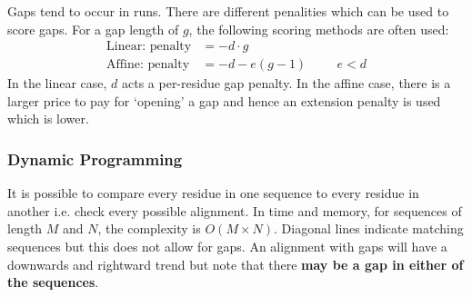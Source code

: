 \documentclass[a4paper]{article}
\newcommand{\ix}[1]{%
  \leavevmode %
  \marginpar{\small\emph{#1}}%
}
\begin{document}
Gaps tend to occur in runs. There are different penalities which can be used to score gaps. For a gap length of $g$, the following scoring methods are often used:
\begin{align*}
\text{Linear: penalty} &= -d \cdot g \\
\text{Affine: penalty} &= -d - e(g-1) \hspace{1cm} e < d
\end{align*}
In the linear case, $d$ acts a per-residue gap penalty. In the affine case, there is a larger price to pay for `opening' a gap and hence an extension penalty is used which is lower.

\subsubsection*{Dynamic Programming}
It\ix{Dotter} is possible to compare every residue in one sequence to every residue in another i.e. check every possible alignment. In time and memory, for sequences of length $M$ and $N$, the complexity is $O(M\times N)$. Diagonal lines indicate matching sequences but this does not allow for gaps. An alignment with gaps will have a downwards and rightward trend but note that there \textbf{may be a gap in either of the sequences}.
\end{document}
